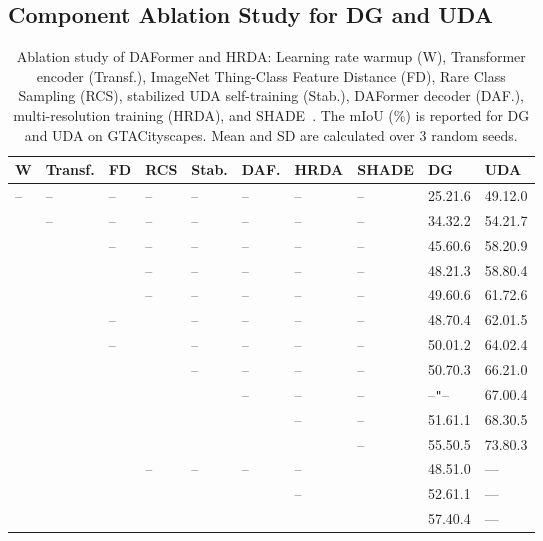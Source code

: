 \documentclass[journal,compsoc]{IEEEtran}
\newcommand*{\cm}{\checkmark}
\newcommand*{\g}{\color{gray}}
\newcommand{\spm}[1]{\tiny{#1}}
\begin{document}
\subsection{Component Ablation Study for DG and UDA}
\label{sec:component_ablation}

\begin{table}
\centering
\caption{
Ablation study of DAFormer and HRDA: Learning rate warmup (W), Transformer encoder (Transf.), ImageNet Thing-Class Feature Distance (FD), Rare Class Sampling (RCS), stabilized UDA self-training (Stab.), DAFormer decoder (DAF.), multi-resolution training (HRDA), and SHADE~\cite{zhao2022style}. The mIoU (\%) is reported for DG and UDA on GTACityscapes. Mean and SD are calculated over 3 random seeds.
}
\label{tab:highlevel_ablation}
\setlength{\tabcolsep}{2pt}
\footnotesize

\begin{tabular}{llllllllll}
\toprule
W & Transf. & FD& RCS & Stab. & DAF. & HRDA & SHADE & DG & UDA \\
\midrule
-- & --  & -- & --  & -- & --  & -- & --  & 25.2\spm{1.6} & 49.1\spm{2.0} \\
\cm & --  & -- & --  & -- & --  & -- & --  & 34.3\spm{2.2} & 54.2\spm{1.7} \\
\cm & \cm & --  & -- & --  & -- & --  & -- & 45.6\spm{0.6} & 58.2\spm{0.9} \\
\midrule
\g \cm & \g \cm & \g  & \g -- & \g -- & \g -- & \g -- & \g -- & \g 48.2\spm{1.3} & \g 58.8\spm{0.4} \\
\cm & \cm & \cm & --  & -- & --  & -- & --  & 49.6\spm{0.6} & 61.7\spm{2.6} \\
\g \cm & \g \cm & \g --  & \g  & \g --  & \g -- & \g --  & \g -- & \g 48.7\spm{0.4}  & \g 62.0\spm{1.5} \\
\cm & \cm & --  & \cm & --  & -- & --  & -- & 50.0\spm{1.2} & 64.0\spm{2.4} \\
\cm & \cm & \cm & \cm & --  & -- & --  & -- & 50.7\spm{0.3} & 66.2\spm{1.0} \\
\cm & \cm & \cm & \cm & \cm & --  & -- & --  & --\texttt{"}-- & 67.0\spm{0.4} \\
\midrule
\cm & \cm & \cm & \cm & \cm & \cm & --  & -- & 51.6\spm{1.1} & 68.3\spm{0.5} \\
\cm & \cm & \cm & \cm & \cm & \cm & \cm & --  & 55.5\spm{0.5} & 73.8\spm{0.3} \\
\midrule
\g \cm & \g \cm & \g \cm & \g -- & \g -- & \g -- & \g --  & \g \cm & \g 48.5\spm{1.0} & \g --- \\
\cm & \cm & \cm & \cm & \cm & \cm & --  & \cm & 52.6\spm{1.1} & --- \\
\cm & \cm & \cm & \cm & \cm & \cm & \cm & \cm & 57.4\spm{0.4} & --- \\
\bottomrule
\end{tabular}

\end{table} 
\end{document}
